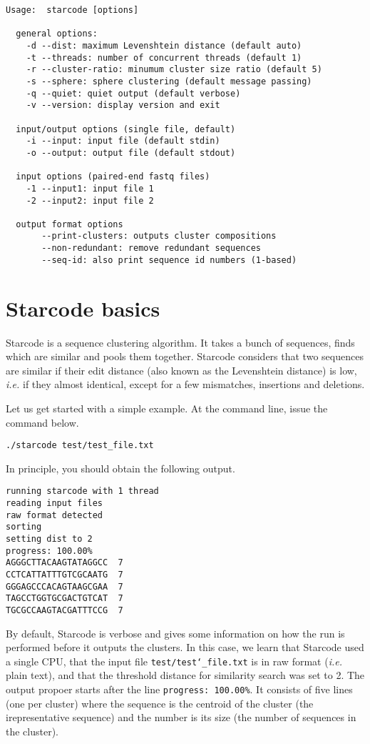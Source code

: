 \documentclass[12pt]{article}
\begin{document}
\begin{verbatim}
Usage:  starcode [options]

  general options:
    -d --dist: maximum Levenshtein distance (default auto)
    -t --threads: number of concurrent threads (default 1)
    -r --cluster-ratio: minumum cluster size ratio (default 5)
    -s --sphere: sphere clustering (default message passing)
    -q --quiet: quiet output (default verbose)
    -v --version: display version and exit

  input/output options (single file, default)
    -i --input: input file (default stdin)
    -o --output: output file (default stdout)

  input options (paired-end fastq files)
    -1 --input1: input file 1
    -2 --input2: input file 2

  output format options
       --print-clusters: outputs cluster compositions
       --non-redundant: remove redundant sequences
       --seq-id: also print sequence id numbers (1-based)
\end{verbatim}

\section{Starcode basics}

Starcode is a sequence clustering algorithm. It takes a bunch of
sequences, finds which are similar and pools them together. Starcode
considers that two sequences are similar if their edit distance
(also known as the Levenshtein distance) is low, \textit{i.e.}
if they almost identical, except for a few mismatches, insertions
and deletions.

Let us get started with a simple example. At the command line,
issue the command below.

\begin{verbatim}
./starcode test/test_file.txt
\end{verbatim}

In principle, you should obtain the following output.

\begin{verbatim}
running starcode with 1 thread
reading input files
raw format detected
sorting
setting dist to 2
progress: 100.00%
AGGGCTTACAAGTATAGGCC  7
CCTCATTATTTGTCGCAATG  7
GGGAGCCCACAGTAAGCGAA  7
TAGCCTGGTGCGACTGTCAT  7
TGCGCCAAGTACGATTTCCG  7
\end{verbatim}

By default, Starcode is verbose and gives some information on
how the run is performed before it outputs the clusters. 
In this case, we learn that Starcode used a single CPU, that
the input file \texttt{test/test\char`_file.txt} is in raw format
(\textit{i.e.} plain text), and that the threshold distance for
similarity search was set to 2. The output propoer starts after
the line \texttt{progress: 100.00\%}. It consists of five lines
(one per cluster) where the sequence is the centroid of the cluster
(the irepresentative sequence) and the number is its size (the
number of sequences in the cluster).
\end{document}
